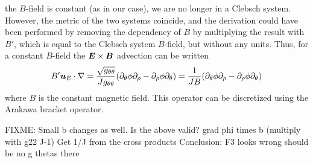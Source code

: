 the $B$-field is constant (as in our case), we are no longer in a Clebsch
system. However, the metric of the two systems coincide, and the derivation
could have been performed by removing the dependency of $B$ by multiplying the
result with $B'$, which is equal to the Clebsch system $B$-field, but without
any units.  Thus, for a constant $B$-field the $\boldsymbol{E}\times\boldsymbol{B}$ advection
can be written
%
\begin{align}
    B'\boldsymbol{u}_E\cdot\nabla
    = \frac{\sqrt{g_{\theta\theta}}}{J g_{\theta\theta}}
    (\partial_\theta\phi\partial_\rho - \partial_\rho\phi\partial_\theta)
    = \frac{1}{JB}
    (\partial_\theta\phi\partial_\rho - \partial_\rho\phi\partial_\theta)
    \label{poi:def}
\end{align}
%
where $B$ is the constant magnetic field.  This operator can be discretized
using the Arakawa bracket operator.

FIXME: Small b changes as well. Is the above valid?
grad phi times b (multiply with g22 J-1)
Get 1/J from the cross products
Conclusion: F3 looks wrong
should be no g thetas there
